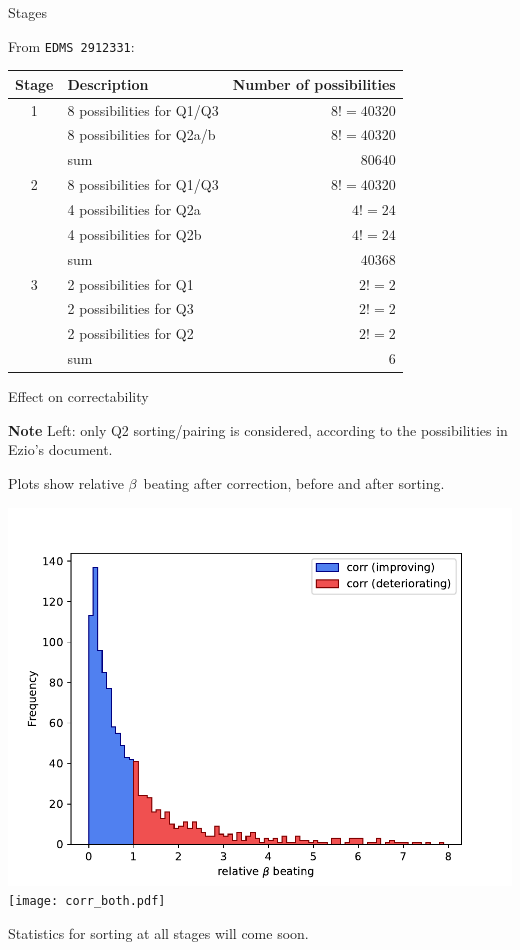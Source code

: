 \documentclass[usenames,dvipsnames,aspectratio=169,table]{beamer}
\begin{document}
\begin{frame} %
    {Stages}

    From \texttt{EDMS 2912331}:\\[0.5em]

    \begin{tabular}{c|l|r}
        \textbf{Stage} & \textbf{Description} & \textbf{Number of possibilities}\\
        \hline
        1 & 8 possibilities for Q1/Q3 & $8! = 40320$\\
          & 8 possibilities for Q2a/b & $8! = 40320$\\
          \hline 
          & sum                       & $80640$\\
          \hline 
          \hline 
        2 & 8 possibilities for Q1/Q3 & $8! = 40320$\\
          & 4 possibilities for Q2a   & $4! = 24$\\
          & 4 possibilities for Q2b   & $4! = 24$\\
          \hline 
          & sum                       & $40368$\\
          \hline 
          \hline 
        3 & 2 possibilities for Q1   & $2! = 2$\\
          & 2 possibilities for Q3   & $2! = 2$\\
          & 2 possibilities for Q2   & $2! = 2$\\
          \hline 
          & sum                       & $6$\\
          \hline 
          \hline 
    \end{tabular}
\end{frame} %

\begin{frame} %
    {Effect on correctability}


    \textbf{Note} Left: only Q2 sorting/pairing is considered, according to the possibilities in Ezio's document.

    Plots show relative $\beta$~beating after correction, before and after sorting.
    
    
    \includegraphics[width=0.45\linewidth]{corr_onlyQ2.pdf}
    \hfill
    \texttt{[image: corr\_both.pdf]}

    Statistics for sorting at all stages will come soon.

\end{frame} %
\end{document}
